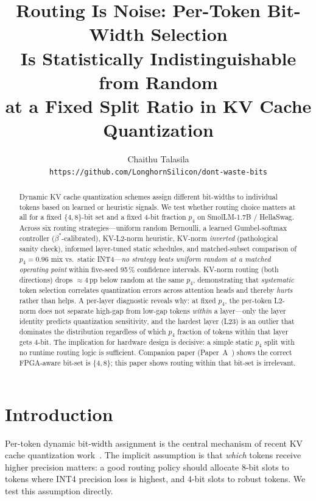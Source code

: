 \documentclass{article}
\title{\textbf{Routing Is Noise: Per-Token Bit-Width Selection\\
Is Statistically Indistinguishable from Random\\
at a Fixed Split Ratio in KV Cache Quantization}}
\author{
  Chaithu Talasila\\
  \texttt{https://github.com/LonghornSilicon/dont-waste-bits}
}
\date{}
\begin{document}
\maketitle

\begin{abstract}
Dynamic KV cache quantization schemes assign different bit-widths to individual tokens based
on learned or heuristic signals. We test whether routing choice matters at all for a fixed
$\{4,8\}$-bit set and a fixed 4-bit fraction $p_4$ on SmolLM-1.7B / HellaSwag.
Across six routing strategies---uniform random Bernoulli, a learned Gumbel-softmax controller
($\beta^*$-calibrated), KV-L2-norm heuristic, KV-norm \emph{inverted} (pathological sanity
check), informed layer-tuned static schedules, and matched-subset comparison of
$p_4{=}0.96$ mix vs.\ static INT4---\emph{no strategy beats uniform random at a matched
operating point} within five-seed 95\,\% confidence intervals.
KV-norm routing (both directions) drops $\approx$4\,pp below random at the same $p_4$,
demonstrating that \emph{systematic} token selection correlates quantization errors across
attention heads and thereby \emph{hurts} rather than helps.
A per-layer diagnostic reveals why: at fixed $p_4$, the per-token L2-norm does not
separate high-gap from low-gap tokens \emph{within} a layer---only the layer identity predicts
quantization sensitivity, and the hardest layer (L23) is an outlier that dominates the
distribution regardless of which $p_4$ fraction of tokens within that layer gets 4-bit.
The implication for hardware design is decisive: a simple static $p_4$ split with no
runtime routing logic is sufficient.
Companion paper (Paper~A~\citep{companion_paper_a}) shows the correct FPGA-aware bit-set
is $\{4,8\}$; this paper shows routing within that bit-set is irrelevant.
\end{abstract}

\section{Introduction}
\label{sec:intro}

Per-token dynamic bit-width assignment is the central mechanism of recent KV cache quantization
work~\citep{haeri2026dwb,liu2024kivi,hooper2024kvquant}. The implicit assumption is that
\emph{which} tokens receive higher precision matters: a good routing policy should allocate
8-bit slots to tokens where INT4 precision loss is highest, and 4-bit slots to robust tokens.
We test this assumption directly.
\end{document}
